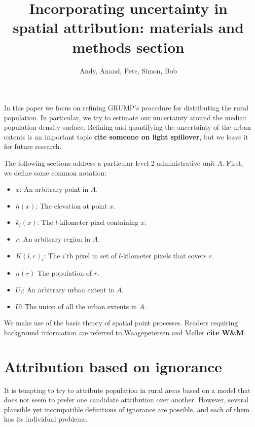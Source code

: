 \documentclass[a4paper]{article}
\begin{document}
\author{Andy, Anand, Pete, Simon, Bob}
\title{Incorporating uncertainty in spatial attribution: materials and methods section}
\maketitle

In this paper we focus on refining GRUMP's procedure for distributing the rural population. In particular, we try to estimate our uncertainty around the median population density surface. Refining and quantifying the uncertainty of the urban extents is an important topic \textbf{cite someone on light spillover}, but we leave it for future research.

The following sections address a particular level 2 administrative unit $A$. First, we define some common notation:
\begin{itemize}
	\item $x$: An arbitrary point in $A$.
	\item $h(x)$: The elevation at point $x$.
	\item $k_l(x)$: The $l$-kilometer pixel containing $x$.
	\item $r$: An arbitrary region in $A$.
	\item $K(l,r)_i$: The $i$'th pixel in set of $l$-kilometer pixels that covers $r$.	
	\item $n(r)$ The population of $r$.
	\item $U_i$: An arbitrary urban extent in $A$.
	\item $U$: The union of all the urban extents in $A$.
\end{itemize}
We make use of the basic theory of spatial point processes. Readers requiring background information are referred to Waagepetersen and M{\o}ller \textbf{cite W\&M}.

\section{Attribution based on ignorance}
It is tempting to try to attribute population in rural areas based on a model that does not seem to prefer one candidate attribution over another. However, several plausible yet incompatible definitions of ignorance are possible, and each of them has its individual problems.
\end{document}
